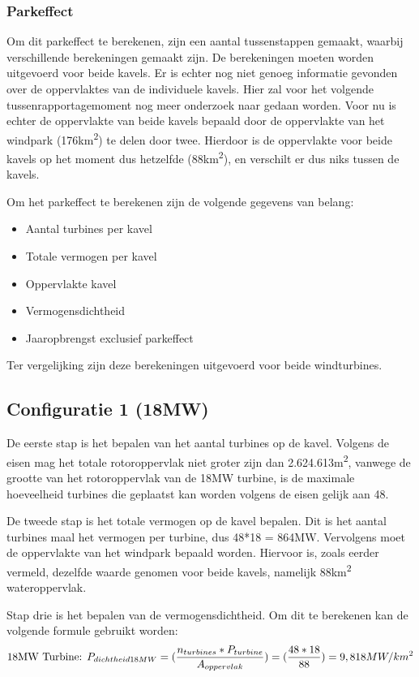 \subsubsection{Parkeffect}
Om dit parkeffect te berekenen, zijn een aantal tussenstappen gemaakt, waarbij verschillende berekeningen gemaakt zijn. De berekeningen moeten worden uitgevoerd voor beide kavels. Er is echter nog niet genoeg informatie gevonden over de oppervlaktes van de individuele kavels. Hier zal voor het volgende tussenrapportagemoment nog meer onderzoek naar gedaan worden. Voor nu is echter de oppervlakte van beide kavels bepaald door de oppervlakte van het windpark (176km\textsuperscript{2}) te delen door twee. Hierdoor is de oppervlakte voor beide kavels op het moment dus hetzelfde (88km\textsuperscript{2}), en verschilt er dus niks tussen de kavels. 

Om het parkeffect te berekenen zijn de volgende gegevens van belang: 
\begin{itemize}
    \item Aantal turbines per kavel
    \item Totale vermogen per kavel
    \item Oppervlakte kavel
    \item Vermogensdichtheid 
    \item Jaaropbrengst exclusief parkeffect
\end{itemize}

Ter vergelijking zijn deze berekeningen uitgevoerd voor beide windturbines. 

\subsection{Configuratie 1 (18MW)}
De eerste stap is het bepalen van het aantal turbines op de kavel. Volgens de eisen mag het totale rotoroppervlak niet groter zijn dan 2.624.613m\textsuperscript{2}, vanwege de grootte van het rotoroppervlak van de 18MW turbine, is de maximale hoeveelheid turbines die geplaatst kan worden volgens de eisen gelijk aan 48. 

De tweede stap is het totale vermogen op de kavel bepalen. Dit is het aantal turbines maal het vermogen per turbine, dus 48*18 = 864MW. Vervolgens moet de oppervlakte van het windpark bepaald worden. Hiervoor is, zoals eerder vermeld, dezelfde waarde genomen voor beide kavels, namelijk 88km\textsuperscript{2} wateroppervlak. 

Stap drie is het bepalen van de vermogensdichtheid. Om dit te berekenen kan de volgende formule gebruikt worden: 
\begin{equation} \label{eq:10}
\text{18MW Turbine: } P_{dichtheid18MW}=(\frac{n_{turbines}*P_{turbine}}{A_{oppervlak}}) = (\frac{48*18}{88}) = 9,818 MW/km\textsuperscript{2}
\end{equation}

